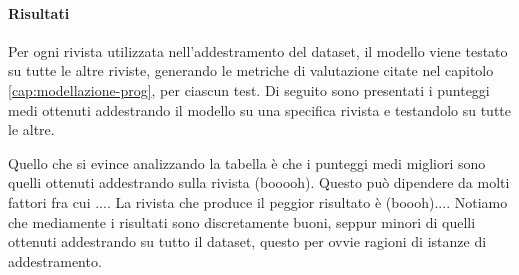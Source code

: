 \documentclass[12pt,a4paper,twoside,openright]{book}
\begin{document}
\paragraph{Risultati}

Per ogni rivista utilizzata nell'addestramento del dataset, il modello viene testato su tutte le altre riviste, generando le metriche di valutazione citate nel capitolo \ref{cap:modellazione-prog}, per ciascun test. Di seguito sono presentati i punteggi medi ottenuti addestrando il modello su una specifica rivista e testandolo su tutte le altre.

Quello che si evince analizzando la tabella è che i punteggi medi migliori sono quelli ottenuti addestrando sulla rivista (booooh). Questo può dipendere da molti fattori fra cui ....
La rivista che produce il peggior risultato è (boooh)....
Notiamo che mediamente i risultati sono discretamente buoni, seppur minori di quelli ottenuti addestrando su tutto il dataset, questo per ovvie ragioni di istanze di addestramento. 
\end{document}
